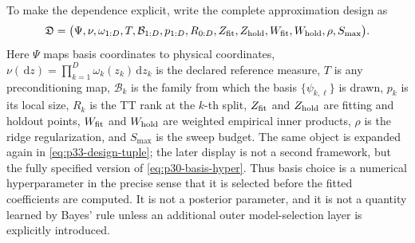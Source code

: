 \documentclass[11pt]{article}
\numberwithin{equation}{section}
\newcommand{\dd}{\,\mathrm d}
\begin{document}
To make the dependence explicit, write the complete approximation design as
\begin{equation}
    \mathfrak D
    =
    \bigl(
    \Psi,\nu,\omega_{1:D},T,\mathcal B_{1:D},p_{1:D},
    R_{0:D},
    Z_{\rm fit},Z_{\rm hold},W_{\rm fit},W_{\rm hold},\rho,S_{\max}
    \bigr).
    \label{eq:p30-basis-hyper}
\end{equation}
Here \(\Psi\) maps basis coordinates to physical coordinates,
\(\nu(\dd z)=\prod_{k=1}^D\omega_k(z_k)\dd z_k\) is the declared reference
measure, \(T\) is any preconditioning map, \(\mathcal B_k\) is the family from
which the basis \(\{\psi_{k,\ell}\}\) is drawn, \(p_k\) is its local size,
\(R_k\) is the TT rank at the \(k\)-th split, \(Z_{\rm fit}\) and
\(Z_{\rm hold}\) are fitting and holdout points, \(W_{\rm fit}\) and
\(W_{\rm hold}\) are weighted empirical inner products, \(\rho\) is the ridge
regularization, and \(S_{\max}\) is the sweep budget.  The same object is
expanded again in \eqref{eq:p33-design-tuple}; the later display is not a
second framework, but the fully specified version of \eqref{eq:p30-basis-hyper}.
Thus basis choice is a numerical
hyperparameter in the precise sense that it is selected before the fitted
coefficients are computed.  It is not a posterior parameter, and it is not a
quantity learned by Bayes' rule unless an additional outer model-selection
layer is explicitly introduced.
\end{document}
